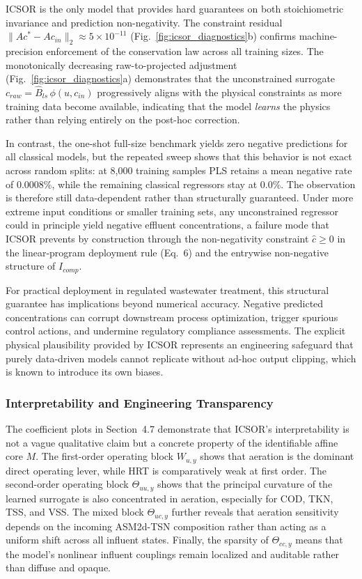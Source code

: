 \documentclass[11pt]{article}
\begin{document}
ICSOR is the only model that provides hard guarantees on both stoichiometric invariance and prediction non-negativity. The constraint residual $\|Ac^* - Ac_{in}\|_2 \approx 5 \times 10^{-11}$ (Fig.~\ref{fig:icsor_diagnostics}b) confirms machine-precision enforcement of the conservation law across all training sizes. The monotonically decreasing raw-to-projected adjustment (Fig.~\ref{fig:icsor_diagnostics}a) demonstrates that the unconstrained surrogate $c_{raw} = \widehat{B}_{ls}\,\phi(u, c_{in})$ progressively aligns with the physical constraints as more training data become available, indicating that the model \textit{learns} the physics rather than relying entirely on the post-hoc correction.

In contrast, the one-shot full-size benchmark yields zero negative predictions for all classical models, but the repeated sweep shows that this behavior is not exact across random splits: at 8{,}000 training samples PLS retains a mean negative rate of 0.0008\%, while the remaining classical regressors stay at 0.0\%. The observation is therefore still data-dependent rather than structurally guaranteed. Under more extreme input conditions or smaller training sets, any unconstrained regressor could in principle yield negative effluent concentrations, a failure mode that ICSOR prevents by construction through the non-negativity constraint $\hat{c} \ge 0$ in the linear-program deployment rule (Eq.~6) and the entrywise non-negative structure of $I_{comp}$.

For practical deployment in regulated wastewater treatment, this structural guarantee has implications beyond numerical accuracy. Negative predicted concentrations can corrupt downstream process optimization, trigger spurious control actions, and undermine regulatory compliance assessments. The explicit physical plausibility provided by ICSOR represents an engineering safeguard that purely data-driven models cannot replicate without ad-hoc output clipping, which is known to introduce its own biases.

\subsubsection{Interpretability and Engineering Transparency}

The coefficient plots in Section~4.7 demonstrate that ICSOR's interpretability is not a vague qualitative claim but a concrete property of the identifiable affine core $M$. The first-order operating block $W_{u,y}$ shows that aeration is the dominant direct operating lever, while HRT is comparatively weak at first order. The second-order operating block $\Theta_{uu,y}$ shows that the principal curvature of the learned surrogate is also concentrated in aeration, especially for COD, TKN, TSS, and VSS. The mixed block $\Theta_{uc,y}$ further reveals that aeration sensitivity depends on the incoming ASM2d-TSN composition rather than acting as a uniform shift across all influent states. Finally, the sparsity of $\Theta_{cc,y}$ means that the model's nonlinear influent couplings remain localized and auditable rather than diffuse and opaque.
\end{document}
